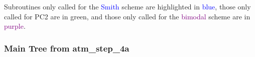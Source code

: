 


Subroutines only called for the \textcolor{blue}{Smith} scheme are highlighted
in \textcolor{blue}{blue}, those only called for \textcolor{mygreen}{PC2} are
in \textcolor{mygreen}{green}, and those only called for
the \textcolor{purple}{bimodal} scheme are in \textcolor{purple}{purple}.

\subsubsection{Main Tree from atm\_step\_4a}

